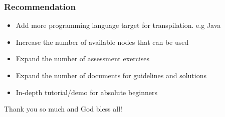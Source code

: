 \documentclass{beamer}
\newcommand{\ui}[1]{
	\begin{frame}
		\frametitle{User-Interface Mockup and Design}
		\begin{figure}
			\texttt{[image: UI/\#1.png]}
		\end{figure}
	\end{frame}
}
\begin{document}
\begin{frame}
	\frametitle{Recommendation}
	\begin{itemize}
		\item<1-> Add more programming language target for transpilation. e.g Java
		\item<2-> Increase the number of available nodes that can be used
		\item<3-> Expand the number of assessment exercises
		\item<4-> Expand the number of documents for guidelines and solutions
		\item<5-> In-depth tutorial/demo for absolute beginners
	\end{itemize}
\end{frame}


\begin{frame}
	\centering
	\huge Thank you so much and God bless all!
\end{frame}
\end{document}
